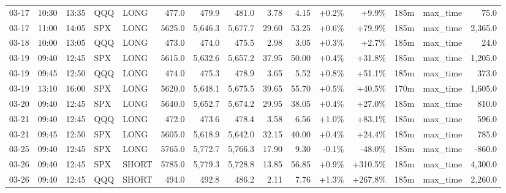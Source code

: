 \documentclass[11pt,a4paper,twoside]{article}
\begin{document}
\begin{landscape}
\begin{center}
\begin{longtable}{>{\color{txtmain}}l l l l l r r r r r r r r >{\color{txtmain}}l r}
03-17 & 10:30 & 13:35 & QQQ & LONG & 477.0 & 479.9 & 481.0 & 3.78 & 4.15 & \textcolor{wingreen}{+0.2\%} & \textcolor{wingreen}{+9.9\%} & 185m & max\_time & \textcolor{wingreen}{75.0} \\
03-17 & 11:00 & 14:05 & SPX & LONG & 5625.0 & 5,646.3 & 5,677.7 & 29.60 & 53.25 & \textcolor{wingreen}{+0.6\%} & \textcolor{wingreen}{+79.9\%} & 185m & max\_time & \textcolor{wingreen}{2,365.0} \\
03-18 & 10:00 & 13:05 & QQQ & LONG & 473.0 & 474.0 & 475.5 & 2.98 & 3.05 & \textcolor{wingreen}{+0.3\%} & \textcolor{wingreen}{+2.7\%} & 185m & max\_time & \textcolor{wingreen}{24.0} \\
03-19 & 09:40 & 12:45 & SPX & LONG & 5615.0 & 5,632.6 & 5,657.2 & 37.95 & 50.00 & \textcolor{wingreen}{+0.4\%} & \textcolor{wingreen}{+31.8\%} & 185m & max\_time & \textcolor{wingreen}{1,205.0} \\
03-19 & 09:45 & 12:50 & QQQ & LONG & 474.0 & 475.3 & 478.9 & 3.65 & 5.52 & \textcolor{wingreen}{+0.8\%} & \textcolor{wingreen}{+51.1\%} & 185m & max\_time & \textcolor{wingreen}{373.0} \\
03-19 & 13:10 & 16:00 & SPX & LONG & 5620.0 & 5,648.1 & 5,675.5 & 39.65 & 55.70 & \textcolor{wingreen}{+0.5\%} & \textcolor{wingreen}{+40.5\%} & 170m & max\_time & \textcolor{wingreen}{1,605.0} \\
03-20 & 09:40 & 12:45 & SPX & LONG & 5640.0 & 5,652.7 & 5,674.2 & 29.95 & 38.05 & \textcolor{wingreen}{+0.4\%} & \textcolor{wingreen}{+27.0\%} & 185m & max\_time & \textcolor{wingreen}{810.0} \\
03-21 & 09:40 & 12:45 & QQQ & LONG & 472.0 & 473.6 & 478.4 & 3.58 & 6.56 & \textcolor{wingreen}{+1.0\%} & \textcolor{wingreen}{+83.1\%} & 185m & max\_time & \textcolor{wingreen}{596.0} \\
03-21 & 09:45 & 12:50 & SPX & LONG & 5605.0 & 5,618.9 & 5,642.0 & 32.15 & 40.00 & \textcolor{wingreen}{+0.4\%} & \textcolor{wingreen}{+24.4\%} & 185m & max\_time & \textcolor{wingreen}{785.0} \\
03-25 & 09:40 & 12:45 & SPX & LONG & 5765.0 & 5,772.7 & 5,766.3 & 17.90 & 9.30 & \textcolor{lossred}{-0.1\%} & \textcolor{lossred}{-48.0\%} & 185m & max\_time & \textcolor{lossred}{-860.0} \\
03-26 & 09:40 & 12:45 & SPX & SHORT & 5785.0 & 5,779.3 & 5,728.8 & 13.85 & 56.85 & \textcolor{wingreen}{+0.9\%} & \textcolor{wingreen}{+310.5\%} & 185m & max\_time & \textcolor{wingreen}{4,300.0} \\
03-26 & 09:40 & 12:45 & QQQ & SHORT & 494.0 & 492.8 & 486.2 & 2.11 & 7.76 & \textcolor{wingreen}{+1.3\%} & \textcolor{wingreen}{+267.8\%} & 185m & max\_time & \textcolor{wingreen}{2,260.0} \\

\end{longtable}
\end{center}
\end{landscape}
\end{document}

